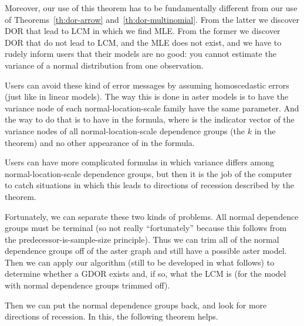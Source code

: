 Moreover, our use of this theorem has to be fundamentally different from
our use of Theorems~\ref{th:dor-arrow} and~\ref{th:dor-multinomial}.
From the latter we discover DOR that lead to LCM in which we find MLE.
From the former we discover DOR that do not lead to LCM, and the MLE
does not exist, and we have to rudely inform users that their models
are no good: you cannot estimate the variance of a normal distribution
from one observation.

Users can avoid these kind of error messages by assuming homoscedastic
errors (just like in linear models).  The way this is done in aster models
is to have the variance node of each normal-location-scale family
have the same parameter.  And the way to do that is to have 
in the formula, where  is the indicator vector of the variance
nodes of all normal-location-scale dependence groups (the $k$ in the theorem)
and no other appearance of  in the formula.

Users can have more complicated formulas in which variance differs among
normal-location-scale dependence groups, but then it is the job of the
computer to catch situations in which this leads to directions of recession
described by the theorem.

Fortunately, we can separate these two kinds of problems.
All normal dependence groups must be terminal (so not really
``fortunately'' because this follows from the predecessor-is-sample-size
principle). 
Thus we can trim all of the normal dependence groups off of the aster graph
and still have a possible aster model.
Then we can apply our algorithm (still to be developed in what follows)
to determine whether a GDOR exists and, if so, what the LCM is
(for the model with normal dependence groups trimmed off).

Then we can put the normal dependence groups back, and look for more
directions of recession.  In this, the following theorem helps.

